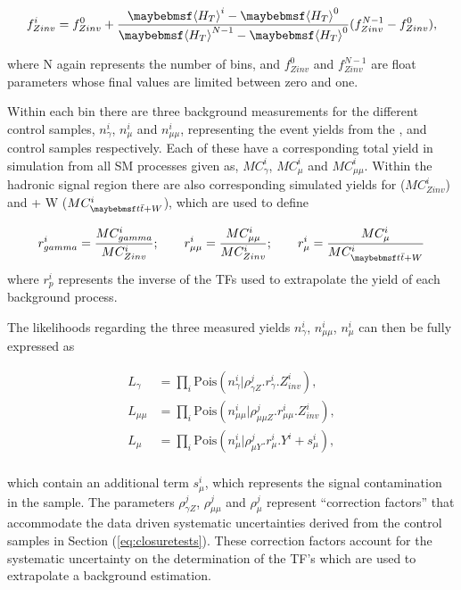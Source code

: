 \begin{equation}
f^{i}_{Zinv} = f^{0}_{Zinv} + \frac{\meanht^{i}-\meanht^{0}}{\meanht^{N-1}-\meanht^{0}}(f^{N-1}_{Zinv} - f^{0}_{Zinv}),
\end{equation}

where N again represents the number of \theht bins, and $f^{0}_{Zinv}$ and $f^{N-1}_{Zinv}$ are float parameters whose final values are limited between zero and one. 

Within each \theht bin there are three background measurements for the different control samples, $n^{i}_{\gamma}$, $n^{i}_{\mu}$ and $n^{i}_{\mu\mu}$, representing the event yields from the \gpjets, \mupjets and \dimupjets control samples respectively. Each of these have a corresponding total yield in simulation from all \ac{SM} processes given as, $MC^{i}_{\gamma}$, $MC^{i}_{\mu}$ and $MC^{i}_{\mu\mu}$.  Within the hadronic signal region there are also corresponding simulated yields for \zinv ($MC^{i}_{Zinv}$) and \ttbar + W ($MC^{i}_{\ttbar+W}$), which are used to define

\begin{equation}
r^{i}_{\gamma} = \frac{MC^{i}_{\gamma}}{MC^{i}_{Zinv}}; \qquad r^{i}_{\mu\mu} = \frac{MC^{i}_{\mu\mu}}{MC^{i}_{Zinv}}; \qquad r^{i}_{\mu} = \frac{MC^{i}_{\mu}}{MC^{i}_{\ttbar + W}} 
\end{equation}
where $r^{i}_{p}$ represents the inverse of the \ac{TF}s used to extrapolate the yield of each background process.

The likelihoods regarding the three measured yields $n^{i}_{\gamma}$, $n^{i}_{\mu\mu}$, $n^{i}_{\mu}$ can then be fully expressed as

\begin{align}
L_{\gamma} &= \prod_{i} \text{Pois} (n^{i}_{\gamma} | \rho^{j}_{\gamma Z} . r^{i}_{\gamma} . Z^{i}_{inv}), \\
L_{\mu\mu} &= \prod_{i} \text{Pois} (n^{i}_{\mu\mu} | \rho^{j}_{\mu\mu Z} . r^{i}_{\mu\mu} . Z^{i}_{inv}), \\
L_{\mu} &= \prod_{i} \text{Pois} (n^{i}_{\mu} | \rho^{j}_{\mu Y} . r^{i}_{\mu} . Y^{i} + s^{i}_{\mu}), \\
\end{align}

which contain an additional term $s^{i}_{\mu}$, which represents the signal contamination in the \mupjets sample. The parameters $\rho^{j}_{\gamma Z}$, $\rho^{j}_{\mu\mu}$ and $\rho^{j}_{\mu}$ represent ``correction factors'' that accommodate the data driven systematic uncertainties derived from the control samples in Section (\ref{eq:closuretests}). These correction factors account for the systematic uncertainty on the determination of the \ac{TF}'s which are used to extrapolate a background estimation.


